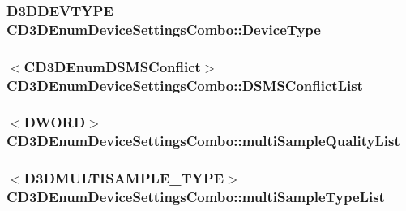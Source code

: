 \label{struct_c_d3_d_enum_device_settings_combo_a4c94ea1feca7fa92797bb93dd1e53e9a}
\hypertarget{struct_c_d3_d_enum_device_settings_combo_a430b870bdc5198bb9148e80b14ff2bd0}{
\subsubsection[{DeviceType}]{\setlength{\rightskip}{0pt plus 5cm}D3DDEVTYPE {\bf CD3DEnumDeviceSettingsCombo::DeviceType}}}
\label{struct_c_d3_d_enum_device_settings_combo_a430b870bdc5198bb9148e80b14ff2bd0}
\hypertarget{struct_c_d3_d_enum_device_settings_combo_a4543dd6327ec6e8cd3fd3eac2842881c}{
\subsubsection[{DSMSConflictList}]{$<${\bf CD3DEnumDSMSConflict}$>$ {\bf CD3DEnumDeviceSettingsCombo::DSMSConflictList}}}
\label{struct_c_d3_d_enum_device_settings_combo_a4543dd6327ec6e8cd3fd3eac2842881c}
\hypertarget{struct_c_d3_d_enum_device_settings_combo_ae7a167a5a9edf29366465cfed4b6d7ed}{
\subsubsection[{multiSampleQualityList}]{$<$DWORD$>$ {\bf CD3DEnumDeviceSettingsCombo::multiSampleQualityList}}}
\label{struct_c_d3_d_enum_device_settings_combo_ae7a167a5a9edf29366465cfed4b6d7ed}
\hypertarget{struct_c_d3_d_enum_device_settings_combo_a55cd4a9f4fe26882fb88ac5f6e97487b}{
\subsubsection[{multiSampleTypeList}]{$<$D3DMULTISAMPLE\_\-TYPE$>$ {\bf CD3DEnumDeviceSettingsCombo::multiSampleTypeList}}}
